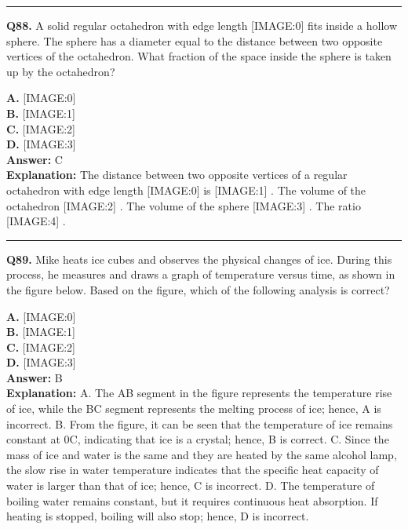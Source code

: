 \documentclass[12pt]{article}
\begin{document}
\hrule
\vspace{1em}


\noindent
\textbf{Q88.} A solid regular octahedron with edge length
[IMAGE:0]
fits inside a hollow sphere. The sphere has a diameter equal to the distance between two opposite vertices of the octahedron. What fraction of the space inside the sphere is taken up by the octahedron?



\textbf{A.} [IMAGE:0] \\
\textbf{B.} [IMAGE:1] \\
\textbf{C.} [IMAGE:2] \\
\textbf{D.} [IMAGE:3] \\

\textbf{Answer:} C \\
\textbf{Explanation:} The distance between two opposite vertices of a regular octahedron with edge length
[IMAGE:0]
is
[IMAGE:1]
. The volume of the octahedron
[IMAGE:2]
. The volume of the sphere
[IMAGE:3]
. The ratio
[IMAGE:4]
.

\hrule
\vspace{1em}


\noindent
\textbf{Q89.} Mike heats ice cubes and observes the physical changes of ice. During this process, he measures and draws a graph of temperature versus time, as shown in the figure below. Based on the figure, which of the following analysis is correct?



\textbf{A.} [IMAGE:0] \\
\textbf{B.} [IMAGE:1] \\
\textbf{C.} [IMAGE:2] \\
\textbf{D.} [IMAGE:3] \\

\textbf{Answer:} B \\
\textbf{Explanation:} A. The AB segment in the figure represents the temperature rise of ice, while the BC segment represents the melting process of ice; hence, A is incorrect.
B. From the figure, it can be seen that the temperature of ice remains constant at 0\circ C, indicating that ice is a crystal; hence, B is correct.
C. Since the mass of ice and water is the same and they are heated by the same alcohol lamp, the slow rise in water temperature indicates that the specific heat capacity of water is larger than that of ice; hence, C is incorrect.
D. The temperature of boiling water remains constant, but it requires continuous heat absorption. If heating is stopped, boiling will also stop; hence, D is incorrect.
\end{document}
